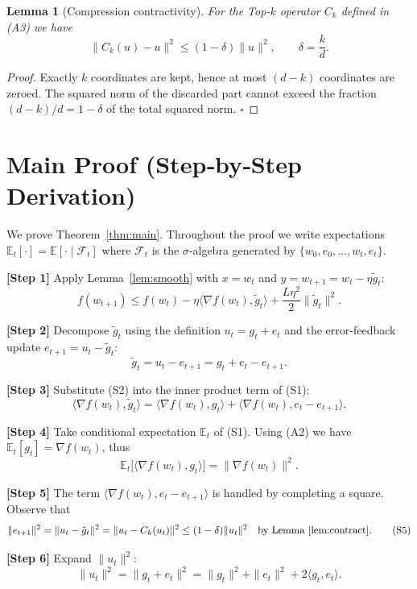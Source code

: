 \documentclass{article}
\newtheorem{lemma}{Lemma}
\begin{document}
\begin{lemma}[Compression contractivity]\label{lem:contract}
For the Top‑$k$ operator $C_k$ defined in (A3) we have
\[
\|C_k(u)-u\|^{2}\le (1-\delta)\|u\|^{2},\qquad\delta=\frac{k}{d}.
\tag{L2}
\]
\end{lemma}
\begin{proof}
Exactly $k$ coordinates are kept, hence at most $(d-k)$ coordinates are zeroed. The squared norm of the discarded part cannot exceed the fraction $(d-k)/d=1-\delta$ of the total squared norm. \hfill $\square$
\end{proof}

\section*{Main Proof (Step‑by‑Step Derivation)}
We prove Theorem~\ref{thm:main}. Throughout the proof we write expectations $\mathbb{E}_t[\cdot]=\mathbb{E}[\cdot\mid \mathcal{F}_t]$ where $\mathcal{F}_t$ is the $\sigma$‑algebra generated by $\{w_0,e_0,\dots,w_t,e_t\}$.

\noindent\textbf{[Step 1]} Apply Lemma~\ref{lem:smooth} with $x=w_t$ and $y=w_{t+1}=w_t-\eta\tilde g_t$:
\[
f(w_{t+1})\le f(w_t)-\eta\langle\nabla f(w_t),\tilde g_t\rangle+\frac{L\eta^{2}}{2}\|\tilde g_t\|^{2}. \tag{S1}
\]

\noindent\textbf{[Step 2]} Decompose $\tilde g_t$ using the definition $u_t=g_t+e_t$ and the error‑feedback update $e_{t+1}=u_t-\tilde g_t$:
\[
\tilde g_t = u_t-e_{t+1}=g_t+e_t-e_{t+1}. \tag{S2}
\]

\noindent\textbf{[Step 3]} Substitute (S2) into the inner product term of (S1):
\[
\langle\nabla f(w_t),\tilde g_t\rangle
= \langle\nabla f(w_t),g_t\rangle
  +\langle\nabla f(w_t),e_t-e_{t+1}\rangle. \tag{S3}
\]

\noindent\textbf{[Step 4]} Take conditional expectation $\mathbb{E}_t$ of (S1). Using (A2) we have $\mathbb{E}_t[g_t]=\nabla f(w_t)$, thus
\[
\mathbb{E}_t\!\big[\langle\nabla f(w_t),g_t\rangle\big]=\|\nabla f(w_t)\|^{2}. \tag{S4}
\]

\noindent\textbf{[Step 5]} The term $\langle\nabla f(w_t),e_t-e_{t+1}\rangle$ is handled by completing a square. Observe that
\[
\|e_{t+1}\|^{2}
= \|u_t-\tilde g_t\|^{2}
= \|u_t-C_k(u_t)\|^{2}
\le (1-\delta)\|u_t\|^{2} \quad\text{by Lemma~\ref{lem:contract}}. \tag{S5}
\]

\noindent\textbf{[Step 6]} Expand $\|u_t\|^{2}$:
\[
\|u_t\|^{2}= \|g_t+e_t\|^{2}
= \|g_t\|^{2}+\|e_t\|^{2}+2\langle g_t,e_t\rangle. \tag{S6}
\]
\end{document}
